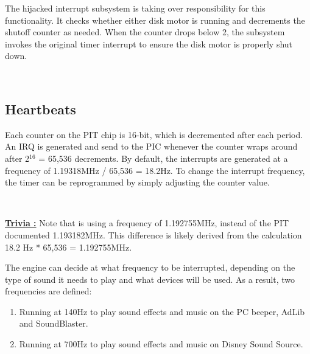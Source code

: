 \documentclass[book.tex]{subfiles}
\begin{document}
\par
The hijacked interrupt subsystem is taking over responsibility for this functionality. It checks whether either disk motor is running and decrements the shutoff counter as needed. When the counter drops below 2, the subsystem invokes the original timer interrupt to ensure the disk motor is properly shut down.\\

\par
\begin{minipage}{\textwidth}

\end{minipage}\\
\par

\subsection{Heartbeats}
Each counter on the PIT chip is 16-bit, which is decremented after each period. An IRQ is generated and send to the PIC whenever the counter wraps around after 2$^{16}$ = 65,536 decrements. By default, the interrupts are generated at a frequency of 1.19318MHz / 65,536 = 18.2Hz. To change the interrupt frequency, the timer can be reprogrammed by simply adjusting the counter value.\\

\par
\begin{minipage}{\textwidth}

\end{minipage}\\
\par

\textbf{\underline{Trivia :}} Note that  is using a frequency of 1.192755MHz, instead of the PIT documented 1.193182MHz. This difference is likely derived from the calculation 18.2 Hz * 65,536 = 1.192755MHz.\\

\par
The engine can decide at what frequency to be interrupted, depending on the type of sound it needs to play and what devices will be used. As a result, two frequencies are defined:
\begin{enumerate}
\item Running at 140Hz to play sound effects and music on the PC beeper, AdLib and SoundBlaster.
\item Running at 700Hz to play sound effects and music on Disney Sound Source.
\end{enumerate}
\end{document}
